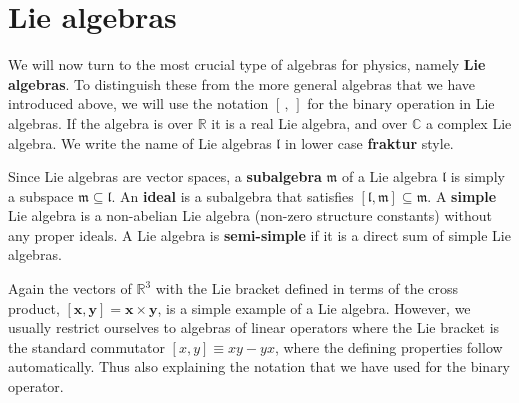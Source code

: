 \documentclass[notes.tex]{subfiles}
\begin{document}
\section{Lie algebras}
\label{sec:lie_algebras}
We will now turn to the most crucial type of algebras for physics, namely {\bf Lie algebras}. To distinguish these from the more general algebras that we have introduced above, we will use the notation $[\,,\,]$ for the binary operation in Lie algebras. 
If the algebra is over $\mathbb R$ it is a real Lie algebra, and over $\mathbb C$ a complex Lie algebra. We write the name of Lie algebras $\mathfrak l$  in lower case {\bf fraktur} style.

Since Lie algebras are vector spaces, a {\bf subalgebra} $\mathfrak m$  of a Lie algebra $\mathfrak l$ is simply a subspace $\mathfrak m\subseteq \mathfrak l$. An {\bf ideal} is a subalgebra that satisfies $[\mathfrak l, \mathfrak m] \subseteq \mathfrak m$. A {\bf simple} Lie algebra is a non-abelian Lie algebra (non-zero structure constants)  without any proper ideals. A Lie algebra is {\bf semi-simple} if it is a direct sum of simple Lie algebras.

Again the vectors of $\mathbb{R}^3$ with the Lie bracket defined in terms of the cross product, $[\mathbf x, \mathbf y]=\mathbf x \times \mathbf y$, is a simple example of a Lie algebra. However, we usually restrict ourselves to algebras of linear operators where the Lie bracket is the standard commutator $[x,y] \equiv xy-yx$, where the defining properties follow automatically. Thus also explaining the notation that we have used for the binary operator. 
\end{document}
